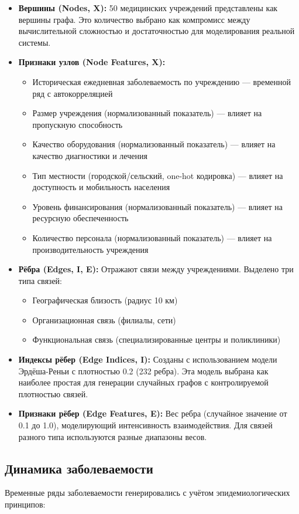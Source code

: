 \documentclass[12pt,a4paper]{article}
\begin{document}
	\begin{itemize}
		\item \textbf{Вершины (Nodes, X):} 50 медицинских учреждений представлены как вершины графа. Это количество выбрано как компромисс между вычислительной сложностью и достаточностью для моделирования реальной системы.
		\item \textbf{Признаки узлов (Node Features, X):} 
		\begin{itemize}
			\item Историческая ежедневная заболеваемость по учреждению — временной ряд с автокорреляцией
			\item Размер учреждения (нормализованный показатель) — влияет на пропускную способность
			\item Качество оборудования (нормализованный показатель) — влияет на качество диагностики и лечения
			\item Тип местности (городской/сельский, one-hot кодировка) — влияет на доступность и мобильность населения
			\item Уровень финансирования (нормализованный показатель) — влияет на ресурсную обеспеченность
			\item Количество персонала (нормализованный показатель) — влияет на производительность учреждения
		\end{itemize}
		\item \textbf{Рёбра (Edges, I, E):} Отражают связи между учреждениями. Выделено три типа связей:
		\begin{itemize}
			\item Географическая близость (радиус 10 км)
			\item Организационная связь (филиалы, сети)
			\item Функциональная связь (специализированные центры и поликлиники)
		\end{itemize}
		\item \textbf{Индексы рёбер (Edge Indices, I):} Созданы с использованием модели Эрдёша-Реньи с плотностью 0.2 (232 ребра). Эта модель выбрана как наиболее простая для генерации случайных графов с контролируемой плотностью связей.
		\item \textbf{Признаки рёбер (Edge Features, E):} Вес ребра (случайное значение от 0.1 до 1.0), моделирующий интенсивность взаимодействия. Для связей разного типа используются разные диапазоны весов.
	\end{itemize}
	
	\subsection{Динамика заболеваемости}
	Временные ряды заболеваемости генерировались с учётом эпидемиологических принципов:
	
\end{document}
